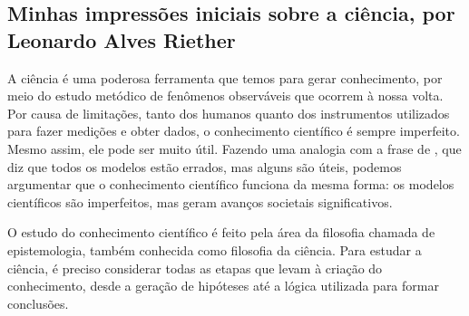 \subsection{Minhas impressões iniciais sobre a ciência, por Leonardo Alves Riether}

A ciência é uma poderosa ferramenta que temos para gerar conhecimento, por meio do estudo metódico de fenômenos observáveis que ocorrem à nossa volta. Por causa de limitações, tanto dos humanos quanto dos instrumentos utilizados para fazer medições e obter dados, o conhecimento científico é sempre imperfeito. Mesmo assim, ele pode ser muito útil. Fazendo uma analogia com a frase de \citet{box_all_2018}, que diz que todos os modelos estão errados, mas alguns são úteis, podemos argumentar que o conhecimento científico funciona da mesma forma: os modelos científicos são imperfeitos, mas geram avanços societais significativos.

O estudo do conhecimento científico é feito pela área da filosofia chamada de \gls{epistemologia}, também conhecida como filosofia da ciência. Para estudar a ciência, é preciso considerar todas as etapas que levam à criação do conhecimento, desde a geração de hipóteses até a lógica utilizada para formar conclusões.
